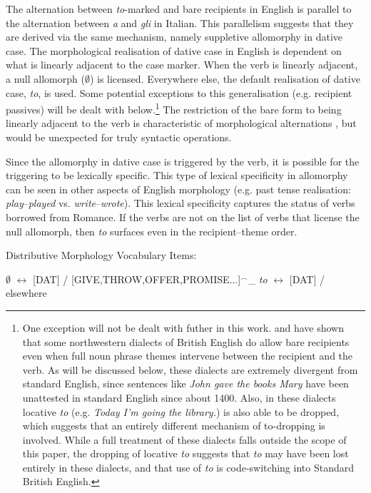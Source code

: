 The alternation between \textit{to}-marked and bare recipients in English is parallel to the alternation between \textit{a} and \textit{gli} in Italian. This parallelism suggests that they are derived via the same mechanism, namely suppletive allomorphy in dative case. The morphological realisation of dative case in English is dependent on what is linearly adjacent to the case marker. When the verb is linearly adjacent, a null allomorph ($\emptyset$) is licensed. Everywhere else, the default realisation of dative case, \textit{to}, is used. Some potential exceptions to this generalisation (e.g. recipient passives) will be dealt with below.\footnote{One exception will not be dealt with futher in this work. \cite{Myler.2011} and \cite{Biggs.2015} have shown that some northwestern dialects of British English do allow bare recipients even when full noun phrase themes intervene between the recipient and the verb. As will be discussed below, these dialects are extremely divergent from standard English, since sentences like \textit{John gave the books Mary} have been unattested in standard English since about 1400. Also, in these dialects locative \textit{to} (e.g. \textit{Today I'm going the library.}) is also able to be dropped, which suggests that an entirely different mechanism of to-dropping is involved. While a full treatment of these dialects falls outside the scope of this paper, the dropping of locative \textit{to} suggests that \textit{to} may have been lost entirely in these dialects, and that use of \textit{to} is code-switching into Standard British English.} The restriction of the bare form to being linearly adjacent to the verb is characteristic of morphological alternations \citep{Embick.2010}, but would be unexpected for truly syntactic operations.

Since the allomorphy in dative case is triggered by the verb, it is possible for the triggering to be lexically specific. This type of lexical specificity in allomorphy can be seen in other aspects of English morphology (e.g. past tense realisation: \textit{play}--\textit{played} vs. \textit{write}--\textit{wrote}). This lexical specificity captures the status of verbs borrowed from Romance. If the verbs are not on the list of verbs that license the null allomorph, then \textit{to} surfaces even in the recipient--theme order.

\begin{exe}
\ex Distributive Morphology \citep{Halle.1993} Vocabulary Items:
\begin{xlist}
\ex $\emptyset$ $\leftrightarrow$ [DAT] / [GIVE,THROW,OFFER,PROMISE...]$^{\smallfrown}$\_
\ex \textit{to} $\leftrightarrow$ [DAT] / elsewhere
\end{xlist}
\end{exe}

